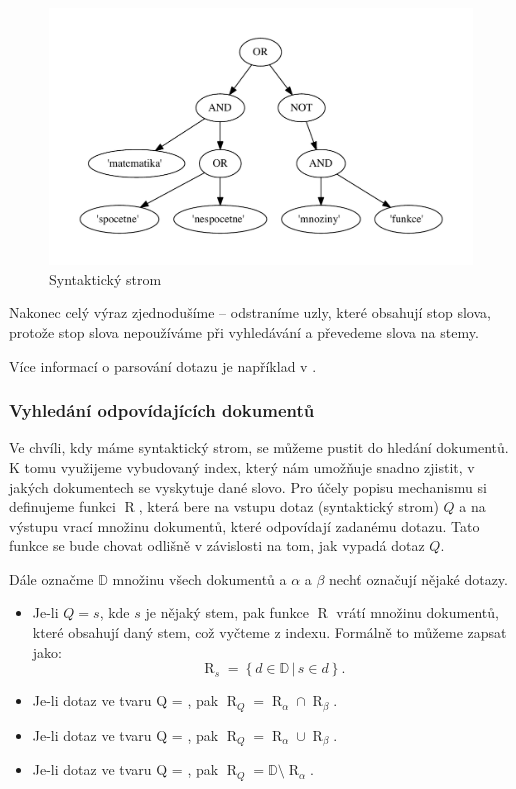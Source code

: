 \documentclass[12pt]{article}
\newcommand{\sep}{\,|\,}
\newcommand{\sssection}[1]{\subsubsection{#1}}
\DeclareMathOperator{\getdocs}{R}
\newcommand{\alldoc}{\mathbb{D}}
\begin{document}
\begin{figure}
  \centering
  \includegraphics[width=14cm]{obrazky/syntactic_tree.pdf}
  \caption{Syntaktický strom}
  \label{fig:syntree}
\end{figure}

Nakonec celý výraz zjednodušíme -- odstraníme uzly, které obsahují stop slova, protože stop slova nepoužíváme při vyhledávání a převedeme slova na stemy. 

Více informací o parsování dotazu je například v \cite{compilers}.

\sssection{Vyhledání odpovídajících dokumentů}

Ve chvíli, kdy máme syntaktický strom, se můžeme pustit do hledání dokumentů. K tomu využijeme vybudovaný index, který nám umožňuje snadno zjistit, v jakých dokumentech se vyskytuje dané slovo. Pro účely popisu mechanismu si definujeme funkci $\getdocs$, která bere na vstupu dotaz (syntaktický strom) $Q$ a na výstupu vrací množinu dokumentů, které odpovídají zadanému dotazu. Tato funkce se bude chovat odlišně v závislosti na tom, jak vypadá dotaz $Q$. 

Dále označme $\alldoc$ množinu všech dokumentů a $\alpha$ a $\beta$ nechť označují nějaké dotazy. 

\begin{itemize}
\item Je-li $Q=s$, kde $s$ je nějaký stem, pak funkce $\getdocs$ vrátí množinu dokumentů, které obsahují daný stem, což vyčteme z indexu. Formálně to můžeme zapsat jako:
$$
\getdocs_s = \left\{d\in \alldoc\sep s\in d\right\}.
$$
\item Je-li dotaz ve tvaru Q = , pak $\getdocs_Q = \getdocs_\alpha \cap \getdocs_\beta$.
\item Je-li dotaz ve tvaru Q = , pak $\getdocs_Q = \getdocs_\alpha \cup \getdocs_\beta$.
\item Je-li dotaz ve tvaru Q = , pak $\getdocs_Q = \alldoc\setminus\getdocs_\alpha$.
\end{itemize}
\end{document}
